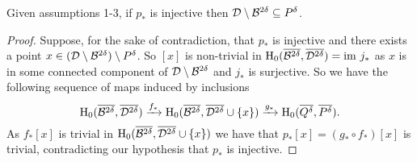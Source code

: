 %
%

\begin{lemma}\label{lem:coverage}
    Given assumptions 1-3, if $p_*$ is injective then ${\mathcal{D}}\setminus{\mathcal{B}}^{2\delta}\subseteq P^\delta$.
\end{lemma}
\begin{proof}
    Suppose, for the sake of contradiction, that $p_*$ is injective and there exists a point $x\in ({\mathcal{D}}\setminus{\mathcal{B}}^{2\delta})\setminus P^\delta$.
    So $[x]$ is non-trivial in $\mathrm{H}_0(\overline{{\mathcal{B}}^{2\delta}},\overline{{\mathcal{D}}^{2\delta}}) = \mathrm{im}~j_*$ as $x$ is in some connected component of ${\mathcal{D}}\setminus{\mathcal{B}}^{2\delta}$ and $j_*$ is surjective.
    So we have the following sequence of maps induced by inclusions
    \[ \mathrm{H}_0(\overline{{\mathcal{B}}^{2\delta}},\overline{{\mathcal{D}}^{2\delta}})\xrightarrow{f_*} \mathrm{H}_0(\overline{{\mathcal{B}}^{2\delta}},\overline{{\mathcal{D}}^{2\delta}}\cup\{x\})\xrightarrow{g_*} \mathrm{H}_0(\overline{Q^\delta},\overline{P^\delta}).\]
    As $f_*[x]$ is trivial in $\mathrm{H}_0(\overline{{\mathcal{B}}^{2\delta}},\overline{{\mathcal{D}}^{2\delta}}\cup\{x\})$ we have that $p_*[x] = (g_*\circ f_*)[x]$ is trivial, contradicting our hypothesis that $p_*$ is injective.
\end{proof}

